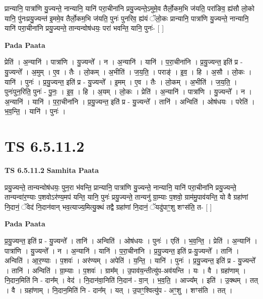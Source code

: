 \documentclass[17pt]{extarticle}
\begin{document}
प्रान्यानि॒ पात्रा॑णि यु॒ज्यन्ते॒ नान्यानि॒ यानि॑ परा॒चीना॑नि प्रयु॒ज्यन्ते॒ऽमुमे॒व तैर्लो॒कम॒भि ज॑यति॒ परा॑ङिव॒ ह्य॑सौ लो॒को यानि॒ पु॑नःप्रयु॒ज्यन्त॑ इ॒ममे॒व तैर्लो॒कम॒भि ज॑यति॒ पुनः॑ पुनरिव॒ ह्य॑यं ॅलो॒कः प्रान्यानि॒ पात्रा॑णि यु॒ज्यन्ते॒ नान्यानि॒ यानि॑ परा॒चीना॑नि प्रयु॒ज्यन्ते॒ तान्यन्वोष॑धयः॒ परा॑ भवन्ति॒ यानि॒ पुनः॑- [  ] \newline

\textbf{Pada Paata} \newline

प्रेति॑ । अ॒न्यानि॑ । पात्रा॑णि । यु॒ज्यन्ते᳚ । न । अ॒न्यानि॑ । यानि॑ । प॒रा॒चीना॑नि । प्र॒यु॒ज्यन्त॒ इति॑ प्र - यु॒ज्यन्ते᳚ । अ॒मुम् । ए॒व । तैः । लो॒कम् । अ॒भीति॑ । ज॒य॒ति॒ । पराङ्॑ । इ॒व॒ । हि । अ॒सौ । लो॒कः । यानि॑ । पुनः॑ । प्र॒यु॒ज्यन्त॒ इति॑ प्र - यु॒ज्यन्ते᳚ । इ॒मम् । ए॒व । तैः । लो॒कम् । अ॒भीति॑ । ज॒य॒ति॒ । पुनः॑पुन॒रिति॒ पुनः॑ - पु॒नः॒ । इ॒व॒ । हि । अ॒यम् । लो॒कः । प्रेति॑ । अ॒न्यानि॑ । पात्रा॑णि । यु॒ज्यन्ते᳚ । न । अ॒न्यानि॑ । यानि॑ । प॒रा॒चीना॑नि । प्र॒यु॒ज्यन्त॒ इति॑ प्र - यु॒ज्यन्ते᳚ । तानि॑ । अन्विति॑ । ओष॑धयः । परेति॑ । भ॒व॒न्ति॒ । यानि॑ । पुनः॑ ।  \newline




\section*{ TS 6.5.11.2 }

\textbf{TS 6.5.11.2 } \newline
\textbf{Samhita Paata} \newline

प्रयु॒ज्यन्ते॒ तान्यन्वोष॑धयः॒ पुन॒रा भ॑वन्ति॒ प्रान्यानि॒ पात्रा॑णि यु॒ज्यन्ते॒ नान्यानि॒ यानि॑ परा॒चीना॑नि प्रयु॒ज्यन्ते॒ तान्यन्वा॑र॒ण्याः प॒शवोऽर॑ण्य॒मप॑ यन्ति॒ यानि॒ पुनः॑ प्रयु॒ज्यन्ते॒ तान्यनु॑ ग्रा॒म्याः प॒शवो॒ ग्राम॑मु॒पाव॑यन्ति॒ यो वै ग्रहा॑णां नि॒दानं॒ ॅवेद॑ नि॒दान॑वान् भव॒त्याज्य॒मित्यु॒क्थं तद्वै ग्रहा॑णां नि॒दानं॒ ॅयदु॑पाꣳ॒॒शु शꣳस॑ति॒ त- [  ] \newline

\textbf{Pada Paata} \newline

प्र॒यु॒ज्यन्त॒ इति॑ प्र - यु॒ज्यन्ते᳚ । तानि॑ । अन्विति॑ । ओष॑धयः । पुनः॑ । एति॑ । भ॒व॒न्ति॒ । प्रेति॑ । अ॒न्यानि॑ । पात्रा॑णि । यु॒ज्यन्ते᳚ । न । अ॒न्यानि॑ । यानि॑ । प॒रा॒चीना॑नि । प्र॒यु॒ज्यन्त॒ इति॑ प्र-यु॒ज्यन्ते᳚ । तानि॑ । अन्विति॑ । आ॒र॒ण्याः । प॒शवः॑ । अर॑ण्यम् । अपेति॑ । य॒न्ति॒ । यानि॑ । पुनः॑ । प्र॒यु॒ज्यन्त॒ इति॑ प्र - यु॒ज्यन्ते᳚ । तानि॑ । अन्विति॑ । ग्रा॒म्याः । प॒शवः॑ । ग्राम᳚म् । उ॒पाव॑य॒न्तीत्यु॑प-अव॑यन्ति । यः । वै । ग्रहा॑णाम् । नि॒दान॒मिति॑ नि - दान᳚म् । वेद॑ । नि॒दान॑वा॒निति॑ नि॒दान॑ - वा॒न् । भ॒व॒ति॒ । आज्य᳚म् । इति॑ । उ॒क्थम् । तत् । वै । ग्रहा॑णाम् । नि॒दान॒मिति॑ नि - दान᳚म् । यत् । उ॒पाꣳ॒॒श्वित्यु॑प - अꣳ॒॒शु । शꣳस॑ति । तत् ।  \newline
\end{document}
